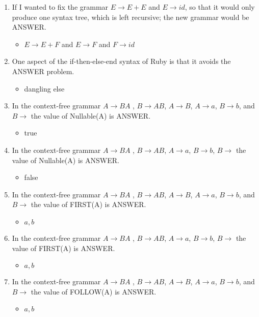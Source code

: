 \documentclass{exam}
\begin{document}
\begin{enumerate}
\item If I wanted to fix the grammar $E \rightarrow E + E$ and $E \rightarrow id$, so that it would only produce one syntax tree, which is left recursive; the new grammar would be ANSWER.
\begin{itemize}
\item $E \rightarrow E + F$ and $E \rightarrow F$ and $F \rightarrow id$
\end{itemize}
\item One aspect of the if-then-else-end syntax of Ruby is that it avoids the ANSWER problem.
\begin{itemize}
\item dangling else
\end{itemize}
\item In the context-free grammar $A \rightarrow B A$ , $B \rightarrow A B$, $A \rightarrow B$, $A \rightarrow a$, $B \rightarrow b$, and $B \rightarrow$  the value of Nullable(A) is ANSWER.
\begin{itemize}
\item true
\end{itemize}
\item In the context-free grammar $A \rightarrow B A$ , $B \rightarrow A B$, $A \rightarrow a$, $B \rightarrow b$, $B \rightarrow$  the value of Nullable(A) is ANSWER.
\begin{itemize}
\item false
\end{itemize}
\item In the context-free grammar $A \rightarrow B A$ , $B \rightarrow A B$, $A \rightarrow B$, $A \rightarrow a$, $B \rightarrow b$, and $B \rightarrow$  the value of FIRST(A) is ANSWER.
\begin{itemize}
\item ${a,b}$
\end{itemize}
\item In the context-free grammar $A \rightarrow B A$ , $B \rightarrow A B$, $A \rightarrow a$, $B \rightarrow b$, $B \rightarrow$  the value of FIRST(A) is ANSWER.
\begin{itemize}
\item ${a,b}$
\end{itemize}
\item In the context-free grammar $A \rightarrow B A$ , $B \rightarrow A B$, $A \rightarrow B$, $A \rightarrow a$, $B \rightarrow b$, and $B \rightarrow$  the value of FOLLOW(A) is ANSWER.
\begin{itemize}
\item ${a,b}$

\end{itemize}
\end{enumerate}
\end{document}
